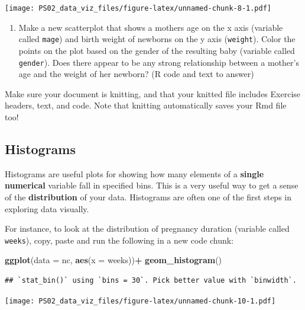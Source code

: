 \documentclass[]{article}
\newenvironment{Shaded}{\begin{snugshade}}{\end{snugshade}}
\newcommand{\DataTypeTok}[1]{\textcolor[rgb]{0.13,0.29,0.53}{#1}}
\newcommand{\KeywordTok}[1]{\textcolor[rgb]{0.13,0.29,0.53}{\textbf{#1}}}
\newcommand{\NormalTok}[1]{#1}
\newcommand{\OperatorTok}[1]{\textcolor[rgb]{0.81,0.36,0.00}{\textbf{#1}}}
\newcommand{\StringTok}[1]{\textcolor[rgb]{0.31,0.60,0.02}{#1}}
\providecommand{\tightlist}{%
  \setlength{\itemsep}{0pt}\setlength{\parskip}{0pt}}
\begin{document}
\texttt{[image: PS02\_data\_viz\_files/figure-latex/unnamed-chunk-8-1.pdf]}

\begin{enumerate}
\def\labelenumi{\arabic{enumi}.}
\tightlist
\item
  Make a new scatterplot that shows a mothers age on the x axis
  (variable called \texttt{mage}) and birth weight of newborns on the y
  axis (\texttt{weight}). Color the points on the plot based on the
  gender of the resulting baby (variable called \texttt{gender}). Does
  there appear to be any strong relationship between a mother's age and
  the weight of her newborn? (R code and text to answer)
\end{enumerate}

\leavevmode\hypertarget{license}{}%
Make sure your document is knitting, and that your knitted file includes
Exercise headers, text, and code. Note that knitting automatically saves
your Rmd file too!

\hypertarget{histograms}{%
\subsection{Histograms}\label{histograms}}

Histograms are useful plots for showing how many elements of a
\textbf{single numerical} variable fall in specified bins. This is a
very useful way to get a sense of the \textbf{distribution} of your
data. Histograms are often one of the first steps in exploring data
visually.

For instance, to look at the distribution of pregnancy duration
(variable called \texttt{weeks}), copy, paste and run the following in a
new code chunk:

\begin{Shaded}
\begin{Highlighting}[]
\KeywordTok{ggplot}\NormalTok{(}\DataTypeTok{data =}\NormalTok{ nc, }\KeywordTok{aes}\NormalTok{(}\DataTypeTok{x =}\NormalTok{ weeks))}\OperatorTok{+}\StringTok{ }
\StringTok{  }\KeywordTok{geom_histogram}\NormalTok{()}
\end{Highlighting}
\end{Shaded}

\begin{verbatim}
## `stat_bin()` using `bins = 30`. Pick better value with `binwidth`.
\end{verbatim}

\texttt{[image: PS02\_data\_viz\_files/figure-latex/unnamed-chunk-10-1.pdf]}
\end{document}

